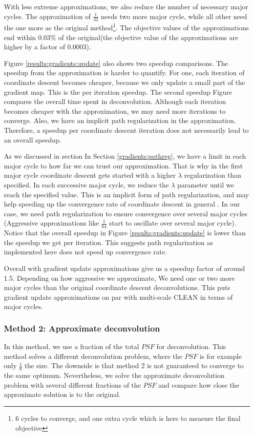 With less extreme approximations, we also reduce the number of necessary major cycles. The approximation of $\frac{1}{32}$ needs two more major cycle, while all other need the one more as the original method\footnote{6 cycles to converge, and one extra cycle which is here to measure the final objective}. The objective values of the approximations end within 0.03\% of the original(the objective value of the approximations are higher by a factor of 0.0003).

Figure \ref{results:gradients:update} also shows two speedup comparisons. The speedup from the approximation is harder to quantify. For one, each iteration of coordinate descent becomes cheaper, because we only update a small part of the gradient map. This is the per iteration speedup. The second speedup Figure compares the overall time spent in deconvolution. Although each iteration becomes cheaper with the approximation, we may need more iterations to converge. Also, we have an implicit path regularization in the approximation. Therefore, a speedup per coordinate descent iteration does not necessarily lead to an overall speedup.

As we discussed in section In Section \ref{gradients:pathreg}, we have a limit in each major cycle to how far we can trust our approximation. That is why in the first major cycle coordinate descent gets started with a higher $\lambda$ regularization than specified. In each successive major cycle, we reduce the $\lambda$ parameter until we reach the specified value. This is an implicit form of path regularization, and may help speeding up the convergence rate of coordinate descent in general \cite{friedman2010regularization}. In our case, we need path regularization to ensure convergence over several major cycles (Aggressive approximations like $\frac{1}{64}$ start to oscillate over several major cycle). Notice that the overall speedup in Figure \ref{results:gradients:update} is lower than the speedup we get per iteration. This suggests path regularization as implemented here does not speed up convergence rate.

Overall with gradient update approximations give us a speedup factor of around 1.5. Depending on how aggressive we approximate, We need one or two more major cycles than the original coordinate descent deconvolutions. This puts gradient update approximations on par with multi-scale CLEAN in terms of major cycles. 

\subsubsection{Method 2: Approximate deconvolution}
In this method, we use a fraction of the total $PSF$ for deconvolution. This method solves a different deconvolution problem, where the $PSF$ is for example only $\frac{1}{8}$ the size. The downside is that method 2 is not guaranteed to converge to the same optimum. Nevertheless, we solve the approximate deconvolution problem with several different fractions of the $PSF$ and compare how close the approximate solution is to the original.

